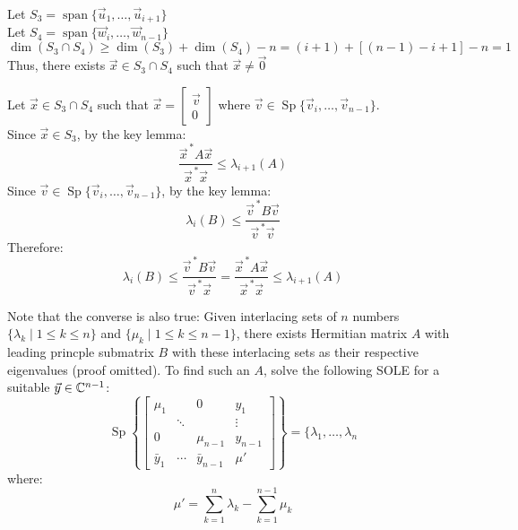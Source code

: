 \documentclass[letterpaper,12pt,fleqn]{article}
\newcommand{\vx}{\vec{x}}
\newcommand{\vxct}{\vx^{\,*}}
\newcommand{\vy}{\vec{y}}
\newcommand{\vu}{\vec{u}}
\newcommand{\vv}{\vec{v}}
\newcommand{\vvct}{\vv^{\,*}}
\newcommand{\vw}{\vec{w}}
\newcommand{\vz}{\vec{0}}
\renewcommand{\l}{\lambda}
\newcommand{\m}{\mu}
\DeclareMathOperator{\Sp}{Sp}
\DeclareMathOperator{\spn}{span}
\begin{document}
\begin{theproof}
  Let $S_3=\spn\{\vu_1,\ldots,\vu_{i+1}\}$ \\
  Let $S_4=\spn\{\vw_i,\ldots,\vw_{n-1}\}$ \\
  $\dim(S_3\cap S_4)\ge\dim(S_3)+\dim(S_4)-n=(i+1)+[(n-1)-i+1]-n=1$ \\
  Thus, there exists $\vx\in S_3\cap S_4$ such that $\vx\ne\vz$

  Let $\vx\in S_3\cap S_4$ such that $\vx=\begin{bmatrix} \vv \\ 0 \end{bmatrix}$ where
  $\vv\in\Sp\{\vv_i,\ldots,\vv_{n-1}\}$. \\
  Since $\vx\in S_3$, by the key lemma:
  \[\frac{\vxct A\vx}{\vxct\vx}\le\l_{i+1}(A)\]
  Since $\vv\in\Sp\{\vv_i,\ldots,\vv_{n-1}\}$, by the key lemma:
  \[\l_i(B)\le\frac{\vvct B\vv}{\vvct\vv}\]
  Therefore:
  \[\l_i(B)\le\frac{\vvct B\vv}{\vvct\vx}=\frac{\vxct A\vx}{\vxct\vx}\le\l_{i+1}(A)\]
\end{theproof}

Note that the converse is also true: Given interlacing sets of $n$ numbers
$\{\l_k\mid 1\le k\le n\}$ and $\{\mu_k\mid 1\le k\le n-1\}$, there exists Hermitian
matrix $A$ with leading princple submatrix $B$ with these interlacing sets as their
respective eigenvalues (proof omitted). To find such an $A$, solve the
following SOLE for a suitable $\vy\in\C^{n-1}$:
\[\Sp\left\{\left[\begin{array}{ccc|c}
    \mu_1 & & 0 & y_1 \\
    & \ddots & & \vdots \\
    0 & & \mu_{n-1} & y_{n-1} \\
    \hline
    \bar{y}_1 & \cdots & \bar{y}_{n-1} & \mu'
  \end{array}\right]\right\}=\{\l_1,\ldots,\l_n\]
where:
\[\mu'=\sum_{k=1}^n\l_k-\sum_{k=1}^{n-1}\m_k\]
\end{document}
